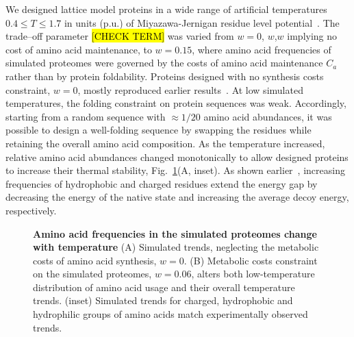 \documentclass[10pt,letterpaper]{article}
\begin{document}
We designed lattice model proteins in a wide range of artificial temperatures $0.4\leq T\leq 1.7$ in units (p.u.) of Miyazawa-Jernigan residue level potential~\cite{Miyazawa1999SelfConsistent}. The trade--off parameter \hl{[CHECK TERM]} was varied from  $w=0$, $w$,$w$ implying no cost of amino acid maintenance, to $w=0.15$, where amino acid frequencies of simulated proteomes were governed by the costs of amino acid maintenance $C_{a}$ rather than by protein foldability. Proteins designed with no synthesis costs constraint, $w=0$, mostly reproduced earlier results~\cite{Berezovsky2007Positive,Venev2015Massively}.
At low simulated temperatures, the folding constraint on protein sequences was weak. Accordingly, starting from a random sequence with $\approx 1/20$ amino acid abundances, it was possible to design a well-folding sequence by swapping the residues while retaining the overall amino acid composition.  As the temperature increased, relative amino acid abundances changed monotonically to allow designed proteins to increase their thermal stability, Fig.~\ref{fig:fig3}(A, inset). As shown earlier~\cite{Berezovsky2007Positive}, increasing frequencies of hydrophobic and charged residues extend the energy gap by decreasing the energy of the native state and increasing the average decoy energy, respectively. 


\begin{figure}[h!]
\caption{
{\bf Amino acid frequencies in the simulated proteomes change with temperature} (A) Simulated trends, neglecting the metabolic costs of amino acid synthesis, $w=0$.  (B) Metabolic costs constraint on the simulated proteomes, $w=0.06$, alters both low-temperature distribution of amino acid usage and their overall temperature trends. (inset) Simulated trends for charged, hydrophobic and hydrophilic groups of amino acids match experimentally observed trends.
}
\label{fig:fig3}
\end{figure}
\end{document}
